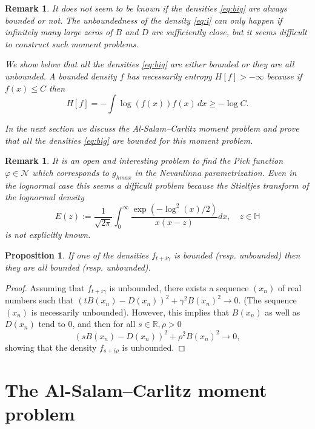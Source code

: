 \documentclass [12pt]{article}
\newtheorem{prop}[thm]{Proposition}
\newtheorem{rem}[thm]{Remark}
\newcommand{\R}{\mathbb{R}}
\renewcommand{\H}{\mathbb{H}}
\begin{document}
\begin{rem} {\rm It does not seem to be known if the densities \eqref{eq:big} are always  bounded or not. The unboundedness of the density \eqref{eq:i} can only happen if infinitely many large zeros of $B$ and $D$ are sufficiently close, but it seems difficult to construct such moment problems.

We show below that  all the densities \eqref{eq:big} are either bounded or they are all unbounded. A bounded density $f$ has necessarily entropy $H[f]>-\infty$ because if $f(x)\le C$ then
$$
H[f]=-\int \log(f(x)) f(x)\,dx\ge -\log C.
$$

In the next section we discuss the Al-Salam--Carlitz moment problem  and prove that all the densities \eqref{eq:big} are bounded for this moment problem.  }
\end{rem}

\begin{rem}{\rm
It is an open and interesting problem to find the Pick function $\varphi\in\mathcal N$ which corresponds to $g_{hmax}$ in the Nevanlinna parametrization. Even in the lognormal case this seems a difficult problem because the Stieltjes transform of the lognormal density
$$
E(z):=\frac{1}{\sqrt{2\pi}}\int_0^\infty \frac{\exp(-\log^2(x)/2)}{x(x-z)}dx,\quad z\in\H
$$
is not explicitly known.}
\end{rem}

\begin{prop}\label{thm:oneall} If one of the densities $f_{t+i\gamma}$ is bounded (resp. unbounded) then they are all bounded (resp. unbounded).
\end{prop}

\begin{proof} Assuming that $f_{t+i\gamma}$ is unbounded, there exists a sequence $(x_n)$ of real numbers such that $(tB(x_n)-D(x_n))^2+\gamma^2 B(x_n)^2\to 0$.
(The sequence $(x_n)$ is necessarily unbounded). However, this implies that $B(x_n)$ as well as $D(x_n)$ tend to 0, and then for all $s\in\R, \rho>0$
$$
(sB(x_n)-D(x_n))^2+\rho^2 B(x_n)^2\to 0,
$$
showing that the density $f_{s+i\rho}$ is unbounded.
\end{proof}







\section{The Al-Salam--Carlitz  moment problem}
\end{document}
